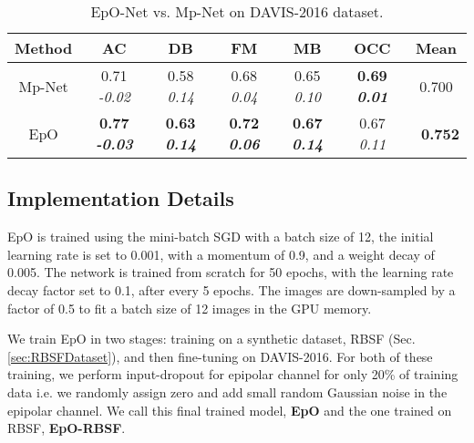 \documentclass[10pt,twocolumn,letterpaper]{article}
\newcommand{\rowSpace}{\vspace{-0.4cm}}
\begin{document}
\setlength{\tabcolsep}{1.0pt}
\begin{table}
\begin{center}
\centering
\begin{tabular}{c|cccccc}
\hline
\hline
Method & AC & DB & FM & MB & OCC & Mean \\
\hline
Mp-Net & 0.71 \emph{\scriptsize{-0.02}} & 0.58 \emph{\scriptsize{0.14}} & 0.68 \emph{\scriptsize{0.04}} &  0.65 \emph{\scriptsize{0.10}} &\bf 0.69 \emph{\scriptsize{0.01}} & 0.700 \\

EpO & \bf 0.77 \emph{\scriptsize{-0.03}} & \bf 0.63 \emph{\scriptsize{0.14}} & \bf 0.72 \emph{\scriptsize{0.06}} & \bf 0.67 \emph{\scriptsize{0.14}} & 0.67 \emph{\scriptsize{0.11}} & \bf\ 0.752 \\
\hline
\hline
\end{tabular}
\caption{EpO-Net vs. Mp-Net \cite{MpNet} on DAVIS-2016 dataset. \label{tab:EpoVsMP}}
\rowSpace
\rowSpace
\rowSpace
\end{center}
\end{table}


\subsection{Implementation Details}
\label{implementationDetails}
  
EpO is trained using the mini-batch SGD with a batch size of 12, the initial learning rate is set to 0.001, with a momentum of 0.9, and a weight decay of 0.005. 
The network is trained from scratch for 50 epochs, with the learning rate decay factor set to 0.1, after every 5 epochs. 
The images are down-sampled by a factor of 0.5 to fit a batch size of 12 images in the GPU memory.
  
We train EpO in two stages: training on a synthetic dataset, RBSF (Sec. \ref{sec:RBSFDataset}), and then fine-tuning on DAVIS-2016. For both of these training, we perform input-dropout for epipolar channel for only 20\% of training data i.e. we randomly assign zero and add small random Gaussian noise in the epipolar channel. We call this final trained model, \textbf{EpO} and the one trained on RBSF, \textbf{EpO-RBSF}.
\end{document}
